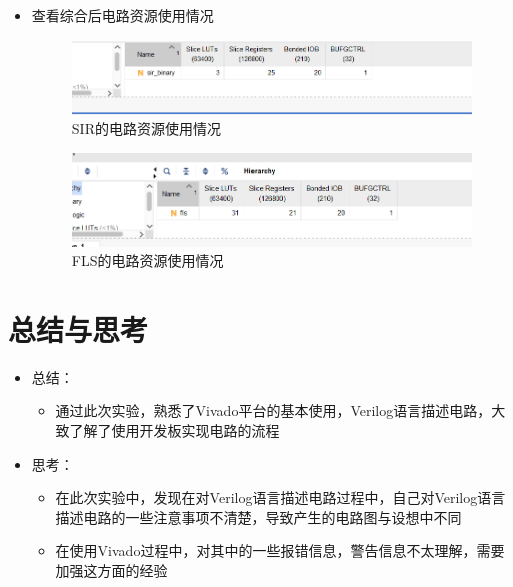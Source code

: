 \documentclass[UTF8,fontset=fandol]{ctexart}
\begin{document}
\begin{itemize}
    
    \item 查看综合后电路资源使用情况
    \begin{figure}[H]
        \centering
        \includegraphics[scale=0.8]{Snipaste_2021-11-18_16-37-34.png}
        \caption{SIR的电路资源使用情况}
    \end{figure}
    
    \begin{figure}[H]
        \centering
        \includegraphics[scale=0.8]{Snipaste_2021-11-18_16-36-07.png}
        \caption{FLS的电路资源使用情况}
    \end{figure}

    
\end{itemize}





\section*{总结与思考}
\begin{itemize}
    \item 总结：
    \begin{itemize}
        \item 通过此次实验，熟悉了Vivado平台的基本使用，Verilog语言描述电路，大致了解了使用开发板实现电路的流程
    \end{itemize}
    \item 思考：
    \begin{itemize}
        \item 在此次实验中，发现在对Verilog语言描述电路过程中，自己对Verilog语言描述电路的一些注意事项不清楚，导致产生的电路图与设想中不同
        \item 在使用Vivado过程中，对其中的一些报错信息，警告信息不太理解，需要加强这方面的经验
    \end{itemize}
\end{itemize}
\end{document}

